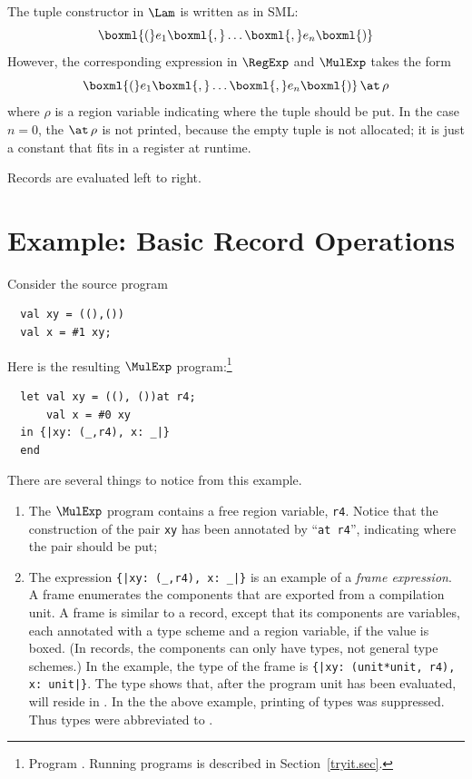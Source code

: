 \documentclass[12pt]{book}
\begin{document}
The tuple constructor in $\Lam$ is written as in SML:
$$\boxml{(}e_1\boxml{,}\ldots\boxml{,}e_n\boxml{)}$$
However, the corresponding expression in $\RegExp$ and $\MulExp$ takes the form
$$\boxml{(}e_1\boxml{,}\ldots\boxml{,}e_n\boxml{)}\,\at\,\rho$$
%
where $\rho$ is a
%
region variable indicating where the tuple should be put.  In the case
$n=0$, the $\at\,\rho$ is not printed, because the empty tuple is not
allocated; it is just a constant that fits in a
%
register at runtime.

Records are evaluated left to right.

\section{Example: Basic Record Operations}
\label{proj.ex}
Consider the source program
\begin{verbatim}
  val xy = ((),())
  val x = #1 xy;
\end{verbatim}
Here is the resulting $\MulExp$ program:\footnote{Program
  . Running programs is described in
  Section~\ref{tryit.sec}.}
\begin{verbatim}
  let val xy = ((), ())at r4;
      val x = #0 xy
  in {|xy: (_,r4), x: _|}
  end
\end{verbatim}
There are several things to notice from this example.
\begin{enumerate}
\item The $\MulExp$ program contains a free region variable, {\tt r4}.
  Notice that the construction of the pair {\tt xy} has been annotated
  by ``{\tt at r4}'', indicating where the pair should be put;
\item The expression \verb+{|xy: (_,r4), x: _|}+ is an example of a
  {\em frame expression}. A frame enumerates the components that are
  exported from a compilation unit.  A frame is similar to a record,
  except that its components are variables, each annotated with a type
  scheme and a region variable, if the value is boxed. (In records, the components can only
  have types, not general type schemes.) In the example, the type of
  the frame is \verb+{|xy: (unit*unit, r4), x: unit|}+.
  The type shows that, after the program unit has been evaluated,
   will reside in .  In the the above example,
  printing of types was suppressed. Thus types were abbreviated to
  \boxml{\_}.
\end{enumerate}
\end{document}
